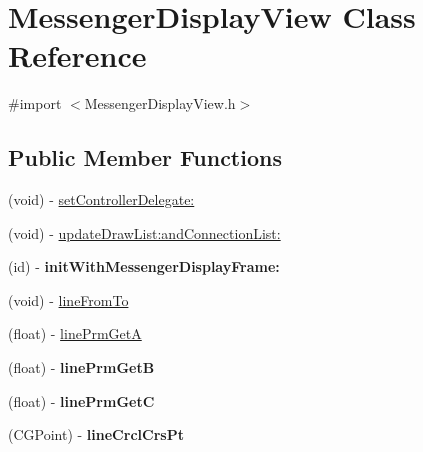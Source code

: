 \hypertarget{interface_messenger_display_view}{
\section{MessengerDisplayView Class Reference}
\label{interface_messenger_display_view}
}


{\ttfamily \#import $<$MessengerDisplayView.h$>$}

\subsection*{Public Member Functions}
\begin{DoxyCompactItemize}
\item 
(void) -\/ \hyperlink{interface_messenger_display_view_ac1aa749dc5f3e7430d8d72841224c919}{setControllerDelegate:}
\item 
(void) -\/ \hyperlink{interface_messenger_display_view_a3790ae1de28d367eb7ec15ec8ed545fb}{updateDrawList:andConnectionList:}
\item 
\hypertarget{interface_messenger_display_view_a35cd00c1a534e3f94111e8ba45bd9cc6}{
(id) -\/ {\bfseries initWithMessengerDisplayFrame:}}
\label{interface_messenger_display_view_a35cd00c1a534e3f94111e8ba45bd9cc6}

\item 
(void) -\/ \hyperlink{interface_messenger_display_view_ad4866b13411e41cdb68d3c92053277eb}{lineFromTo}
\item 
(float) -\/ \hyperlink{interface_messenger_display_view_ac1379b56ac2e7d2b572e147e81971e90}{linePrmGetA}
\item 
\hypertarget{interface_messenger_display_view_a71965f56d6a2665d3f71b0c4ecfe13d0}{
(float) -\/ {\bfseries linePrmGetB}}
\label{interface_messenger_display_view_a71965f56d6a2665d3f71b0c4ecfe13d0}

\item 
\hypertarget{interface_messenger_display_view_ad3b01c0e203aaec5c631091448026ad8}{
(float) -\/ {\bfseries linePrmGetC}}
\label{interface_messenger_display_view_ad3b01c0e203aaec5c631091448026ad8}

\item 
\hypertarget{interface_messenger_display_view_a85472d3e727eb4b6a41ad9f71b83f4f7}{
(CGPoint) -\/ {\bfseries lineCrclCrsPt}}
\label{interface_messenger_display_view_a85472d3e727eb4b6a41ad9f71b83f4f7}

\end{DoxyCompactItemize}
